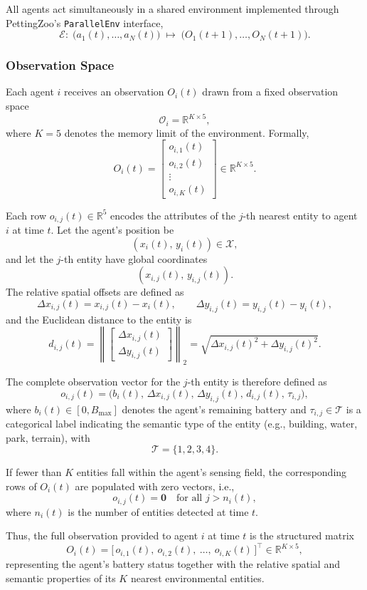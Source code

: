 \documentclass[conference]{IEEEtran}
\begin{document}
All agents act simultaneously in a shared environment implemented through PettingZoo's \texttt{ParallelEnv} interface, 
\[
\mathcal{E}:\; \big(a_1(t), \dots, a_N(t)\big)
\;\longmapsto\;
\big(O_1(t+1), \dots, O_N(t+1)\big).
\]
\subsubsection{Observation Space}
Each agent \(i\) receives an observation \(O_i(t)\) drawn from a fixed observation space
\[
\mathcal{O}_i = \mathbb{R}^{K \times 5},
\]
where \(K = 5\) denotes the memory limit of the environment. Formally,
\[
O_i(t) = 
\begin{bmatrix}
o_{i,1}(t) \\
o_{i,2}(t) \\
\vdots \\
o_{i,K}(t)
\end{bmatrix}
\in \mathbb{R}^{K \times 5}.
\]

Each row \(o_{i,j}(t) \in \mathbb{R}^5\) encodes the attributes of the \(j\)-th nearest entity to agent \(i\) at time \(t\). Let the agent's position be
\[
(x_i(t),\, y_i(t)) \in \mathcal{X},
\]
and let the \(j\)-th entity have global coordinates
\[
(x_{i,j}(t),\, y_{i,j}(t)).
\]
The relative spatial offsets are defined as
\[
\Delta x_{i,j}(t) = x_{i,j}(t) - x_i(t), \qquad
\Delta y_{i,j}(t) = y_{i,j}(t) - y_i(t),
\]
and the Euclidean distance to the entity is
\[
d_{i,j}(t)
= \left\| 
\begin{bmatrix}
\Delta x_{i,j}(t) \\[4pt]
\Delta y_{i,j}(t)
\end{bmatrix}
\right\|_2
= \sqrt{\Delta x_{i,j}(t)^2 + \Delta y_{i,j}(t)^2}.
\]

The complete observation vector for the \(j\)-th entity is therefore defined as
\[
o_{i,j}(t)
=
\big(
b_i(t),\,
\Delta x_{i,j}(t),\,
\Delta y_{i,j}(t),\,
d_{i,j}(t),\,
\tau_{i,j}
\big),
\]
where \(b_i(t) \in [0, B_{\max}]\) denotes the agent's remaining battery and 
\(\tau_{i,j} \in \mathcal{T}\) is a categorical label indicating the semantic type of the entity (e.g., building, water, park, terrain), with
\[
\mathcal{T} = \{1,2,3,4\}.
\]

If fewer than \(K\) entities fall within the agent's sensing field, the corresponding rows of \(O_i(t)\) are populated with zero vectors, i.e.,
\[
o_{i,j}(t) = \mathbf{0} \quad \text{for all } j > n_i(t),
\]
where \(n_i(t)\) is the number of entities detected at time \(t\).

Thus, the full observation provided to agent \(i\) at time \(t\) is the structured matrix
\[
O_i(t)
=
\big[\, o_{i,1}(t),\ o_{i,2}(t),\ \dots,\ o_{i,K}(t) \,\big]^\top
\in \mathbb{R}^{K \times 5},
\]
representing the agent's battery status together with the relative spatial and semantic properties of its \(K\) nearest environmental entities.
\end{document}
